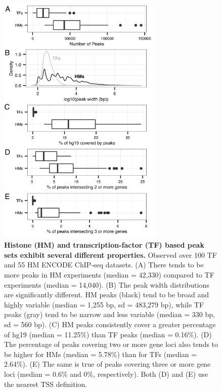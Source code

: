 \begin{figure}[ht!]
\centering
\includegraphics[width=0.7\textwidth]{chap2figs/figure2_2.pdf}
\caption[Histone (HM) and transcription-factor (TF) based peak sets exhibit several different properties.]
{
\textbf{Histone (HM) and transcription-factor (TF) based peak sets exhibit several different properties.} Observed over 100 TF and 55 HM ENCODE ChIP-seq datasets. (A) There tends to be more peaks in HM  experiments (median = 42,330) compared to TF experiments (median = 14,040). (B) The peak width distributions are significantly different. HM peaks (black) tend to be broad and highly variable (median = 1,255 bp, sd = 483,279 bp), while TF peaks (gray) tend to be narrow and less variable (median = 330 bp, sd = 560 bp). (C) HM peaks consistently cover a greater percentage of hg19 (median = 11.25\%) than TF peaks (median = 0.16\%). (D) The percentage of peaks covering two or more gene loci also tends to be higher for HMs (median = 5.78\%) than for TFs (median = 2.64\%). (E) The same is true of peaks covering three or more gene loci (median = 0.6\% and 0\%, respectively). Both (D) and (E) use the nearest TSS definition.
}
\label{chap2:fig:2}
\end{figure}

